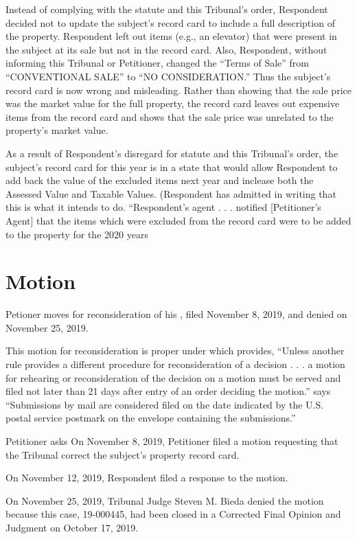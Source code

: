 \documentclass[12pt,\documentclassflag]{michiganCourtOfAppealsBrief}
\begin{document}
Instead of complying with the statute and this Tribunal's order, Respondent decided not to update the subject's record card to include a full description of the property. Respondent left out items (e.g., an elevator) that were present in the subject at its sale but not in the record card. Also, Respondent, without informing this Tribunal or Petitioner, changed the ``Terms of Sale'' from ``CONVENTIONAL SALE'' to ``NO CONSIDERATION.'' Thus the subject's record card is now wrong and misleading. Rather than showing that the sale price was the market value for the full property, the record card leaves out expensive items from the record card and shows that the sale price was unrelated to the property's market value. 

As a result of Respondent's disregard for statute and this Tribunal's order, the subject's record card for this year is in a state that would allow Respondent to add back the value of the excluded items next year and inclease both the Assessed Value and Taxable Values. (Respondent has admitted in writing that this is what it intends to do. ``Respondent's agent . . . notified [Petitioner's Agent] that the items which were excluded from the record card were to be added to the property for the 2020 years
\section{Motion}

Petioner moves for reconsideration of his \cite{Motion to correct record card}, filed November 8, 2019, and denied on November 25, 2019. 

This motion for reconsideration is proper under  which provides, ``Unless another rule provides a different procedure for reconsideration of a decision . . . a motion for rehearing or reconsideration of the decision on a motion must be served and filed not later than 21 days after entry of an order deciding the motion.''
\cite{TTR 219(5)} says ``Submissions by mail are considered filed on the date indicated by the U.S. postal service postmark on the envelope containing the submissions.'' 


Petitioner asks 
On November 8, 2019, Petitioner filed a motion requesting that the Tribunal correct the subject's property record card.

On November 12, 2019, Respondent filed a response to the motion.

On November 25, 2019, Tribunal Judge Steven M. Bieda denied the motion because this case, 19-000445, had been closed in a Corrected Final Opinion and Judgment on October 17, 2019.
\end{document}
